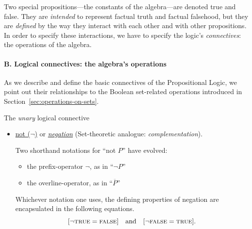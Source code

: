 \smallskip

\noindent
Two special propositions---the constants of the algebra---are denoted {\sc true} and {\sc false}.  They are {\em intended} to represent factual truth and factual falsehood, but they are {\em defined} by the way they interact with each other and with other propositions.  In order
to specify these interactions, we have to specify the logic's {\it connectives}: the operations of the algebra.

\bigskip

\paragraph{B. Logical connectives: the algebra's operations}

\noindent
As we describe and define the basic connectives of the Propositional Logic, we point out their relationships to the Boolean set-related operations introduced in Section~\ref{sec:operations-on-sets}.

\medskip

 {\small\sf The {\em unary} logical connective}
\begin{itemize}
\item
\underline{{\sc not} ($\neg$)} or \underline{\it negation}
\hspace*{.1in}
{\small\sf (Set-theoretic analogue: {\em complementation})}.

\smallskip

Two shorthand notations for ``{\sc not} $P$'' have evolved:
  \begin{itemize}
  \item
the prefix-operator $\neg$, as in ``$\neg P$''
  \medskip\item
the overline-operator, as in ``$\overline{P}$''
  \end{itemize}
Whichever notation one uses, the defining properties of negation are encapsulated in the following equations.
\[
[\neg \mbox{\sc true} = \mbox{\sc false}] \ \ \mbox{ and } \ \ [\neg
  \mbox{\sc false} = \mbox{\sc true}].
\]
\end{itemize}

\medskip

